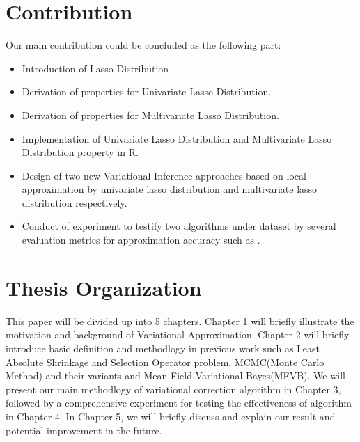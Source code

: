 \section{Contribution}
\label{cont}
Our main contribution could be concluded as the following part:
\begin{itemize}
	\item Introduction of Lasso Distribution
	\item Derivation of properties for Univariate Lasso Distribution.
	\item Derivation of properties for Multivariate Lasso Distribution.
	\item Implementation of Univariate Lasso Distribution and Multivariate Lasso Distribution property in R.
	\item Design of two new Variational Inference approaches based on local approximation by univariate lasso distribution and multivariate lasso distribution respectively.
	\item Conduct of experiment to testify two algorithms under  dataset by several evaluation metrics for approximation accuracy such as .
\end{itemize}



\section{Thesis Organization}
This paper will be divided up into 5 chapters. Chapter 1 will briefly illustrate the motivation and background of Variational Approximation. Chapter 2 will briefly introduce basic definition and methodlogy in previous work such as Least Absolute Shrinkage and Selection Operator problem, MCMC(Monte Carlo Method) and their variants and Mean-Field Variational Bayes(MFVB). We will present our main methodlogy of variational correction algorithm in Chapter 3, followed by a comprehensive experiment for testing the effectiveness of algorithm in Chapter 4. In Chapter 5, we will briefly discuss and explain our result and potential improvement in the future. 



 